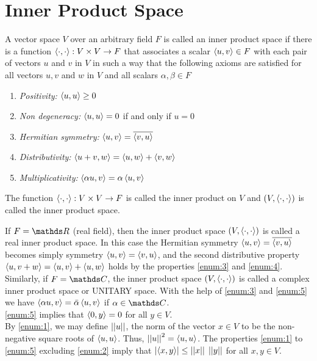 \documentclass[../main-sheet.tex]{subfiles}
\begin{document}
\section{Inner Product Space}
A vector space $ V $ over an arbitrary field $ F $ is called an inner product space if there is a function $ \left<\cdot,\cdot\right>:V\times V\to F $ that associates a scalar $ \left<u,v\right>\in F $ with each pair of vectors $ u $ and $ v $ in $ V $ in such a way that the following axioms are satisfied for all vectors $ u,v $ and $ w $ in $ V $ and all scalars $ \alpha, \beta \in F $
\begin{enumerate}[label=(\roman*)]
    \item \emph{Positivity:} $ \left<u,u\right>\geq 0 $\label{enum:1}
    \item \emph{Non degeneracy:} $ \left<u,u\right>= 0 $ if and only if $ u=0 $\label{enum:2}
    \item \emph{Hermitian symmetry:} $ \left<u,v\right>=\overline{\left<v,u\right>} $ \label{enum:3}
    \item \emph{Distributivity:} $ \left<u+v,w\right>= \left<u,w\right>+\left<v,w\right> $ \label{enum:4}
    \item \emph{Multiplicativity:} $ \left<\alpha u,v\right>= \alpha \left<u,v\right>$ \label{enum:5}
\end{enumerate}
\begin{note}
    The function $ \left<\cdot,\cdot\right>:V\times V\to F $ is called the inner product on $ V $ and $ (V,\left<\cdot,\cdot\right>) $ is called the inner product space.
\end{note}
\begin{note}
    If $ F=\R $ (real field), then the inner product space $ (V,\left<\cdot,\cdot\right>) $ is called a real inner product space. In this case the Hermitian symmetry $ \left<u,v\right>=\overline{\left<v,u\right>} $ becomes simply symmetry $ \left<u,v\right>=\left<v,u\right> $, and the second distributive property $ \left<u,v+w\right>= \left<u,v\right>+\left<u,w\right> $ holds by the properties \ref{enum:3} and \ref{enum:4}.\\
    
    Similarly, if $ F=\C $, the inner product space $ (V,\left<\cdot,\cdot\right>) $ is called a complex inner product space or UNITARY space. With the help of \ref{enum:3} and \ref{enum:5} we have $ \left<\alpha u,v\right>= \bar{\alpha} \left<u,v\right>$ if $ \alpha\in\C $.\\
    
    \ref{enum:5} implies that $ \left<0,y\right>=0 $ for all $ y\in V $.\\

    By \ref{enum:1}, we may define $ \left\vert\left\vert u\right\vert\right\vert $, the norm of the vector $ x\in V $ to be the non-negative square roots of $ \left<u,u\right> $. Thus, $ \left\vert\left\vert u\right\vert\right\vert^2=\left<u,u\right> $. The properties \ref{enum:1} to \ref{enum:5} excluding \ref{enum:2} imply that $ \left\vert\left<x,y\right>\right\vert\leq \left\vert\left\vert x\right\vert\right\vert\;\left\vert\left\vert y\right\vert\right\vert $ for all $ x,y\in V $.
\end{note}
\end{document}

